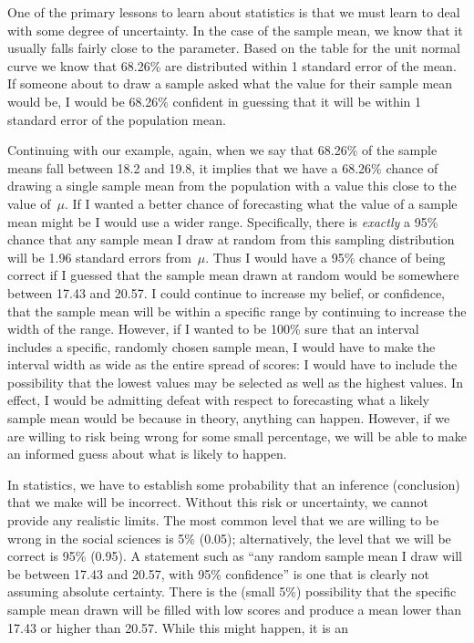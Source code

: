 \documentclass[12pt]{article}
\begin{document}
One of the primary lessons to learn about statistics is that we must learn to deal with some degree of uncertainty. In the case of the sample mean, we know that it usually falls fairly close to the parameter. Based on the table for the unit normal curve we know that 68.26\% are distributed within 1 standard error of the mean. If someone about to draw a sample asked what the value for their sample mean would be, I would be 68.26\% confident in guessing that it will be within 1 standard error of the population mean.

Continuing with our example, again, when we say that 68.26\% of the sample means fall between 18.2 and 19.8, it implies that we have a 68.26\% chance of drawing a single sample mean from the population with a value this close to the value of~$\mu$. If I wanted a better chance of forecasting what the value of a sample mean might be I would use a wider range. Specifically, there is \textit{exactly} a 95\% chance that any sample mean I draw at random from this sampling distribution will be 1.96 standard errors from~$\mu$. Thus I would have a 95\% chance of being correct if I guessed that the sample mean drawn at random would be somewhere between 17.43 and 20.57. I could continue to increase my belief, or confidence, that the sample mean will be within a specific range by continuing to increase the width of the range. However, if I wanted to be 100\% sure that an interval includes a specific, randomly chosen sample mean, I would have to make the interval width as wide as the entire spread of scores: I would have to include the possibility that the lowest values may be selected as well as the highest values. In effect, I would be admitting defeat with respect to forecasting what a likely sample mean would be because in theory, anything can happen. However, if we are willing to risk being wrong for some small percentage, we will be able to make an informed guess about what is likely to happen.

In statistics, we have to establish some probability that an inference (conclusion) that we make will be incorrect. Without this risk or uncertainty, we cannot provide any realistic limits. The most common level that we are willing to be wrong in the social sciences is 5\% (0.05); alternatively, the level that we will be correct is 95\% (0.95). A statement such as ``any random sample mean I draw will be between 17.43 and 20.57, with 95\% confidence'' is one that is clearly not assuming absolute certainty. There is the (small 5\%) possibility that the specific sample mean drawn will be filled with low scores and produce a mean lower than 17.43 or higher than 20.57. While this might happen, it is an
\end{document}
